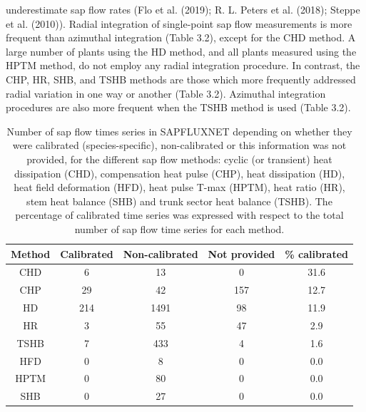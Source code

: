 \documentclass[11pt,twoside]{reedthesis}
\begin{document}
underestimate sap flow rates (Flo et al. (2019); R. L. Peters et al.
(2018); Steppe et al. (2010)). Radial integration of single-point sap
flow measurements is more frequent than azimuthal integration (Table
3.2), except for the CHD method. A large number of plants using the HD
method, and all plants measured using the HPTM method, do not employ any
radial integration procedure. In contrast, the CHP, HR, SHB, and TSHB
methods are those which more frequently addressed radial variation in
one way or another (Table 3.2). Azimuthal integration procedures are
also more frequent when the TSHB method is used (Table 3.2).\par
\begin{table}[!h]

\caption[Number of sap flow times series in SAPFLUXNET depending on whether they were calibrated for the different sap flow methods.]{\label{tab:Ch3T1}Number of sap flow times series in SAPFLUXNET depending on whether they were calibrated (species-specific), non-calibrated or this information was not provided, for the different sap flow methods: cyclic (or transient) heat dissipation (CHD), compensation heat pulse (CHP), heat dissipation (HD), heat field deformation (HFD), heat pulse T-max (HPTM), heat ratio (HR), stem heat balance (SHB) and trunk sector heat balance (TSHB). The percentage of calibrated time series was expressed with respect to the total number of sap flow time series for each method.}
\centering
\fontsize{10}{12}\selectfont
\begin{tabular}[t]{ccccc}
\toprule
Method & Calibrated & Non-calibrated & Not provided & \% calibrated\\
\midrule
CHD & 6 & 13 & 0 & 31.6\\
CHP & 29 & 42 & 157 & 12.7\\
HD & 214 & 1491 & 98 & 11.9\\
HR & 3 & 55 & 47 & 2.9\\
TSHB & 7 & 433 & 4 & 1.6\\
HFD & 0 & 8 & 0 & 0.0\\
HPTM & 0 & 80 & 0 & 0.0\\
SHB & 0 & 27 & 0 & 0.0\\
\bottomrule
\end{tabular}
\end{table}
\end{document}
